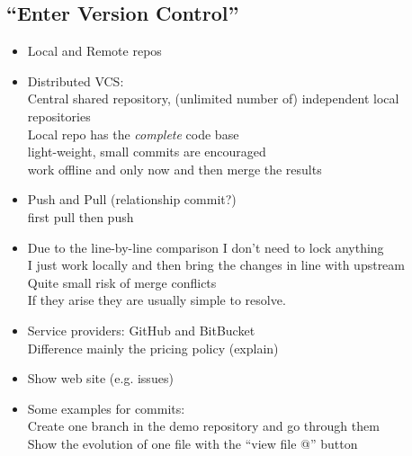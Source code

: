 \documentclass[../../LilyPond-Tutorials]{subfiles}
\begin{document}
\subsection*{“Enter Version Control”}
\begin{itemize}
\item Local and Remote repos
\item Distributed VCS:\\
Central shared repository, (unlimited number of) independent local repositories\\
Local repo has the \emph{complete} code base\\
light-weight, small commits are encouraged\\
work offline and only now and then merge the results
\item Push and Pull (relationship commit?)\\
first pull then push
\item Due to the line-by-line comparison I don't need to lock anything\\
I just work locally and then bring the changes in line with upstream\\
Quite small risk of merge conflicts\\
If they arise they are usually simple to resolve.
\end{itemize}

\begin{itemize}
\item Service providers: GitHub and BitBucket\\
Difference mainly the pricing policy (explain)
\item Show web site (e.g. issues)
\item Some examples for commits:\\
Create one branch in the demo repository and go through them \\
Show the evolution of one file with the “view file @” button
\end{itemize}
\end{document}
